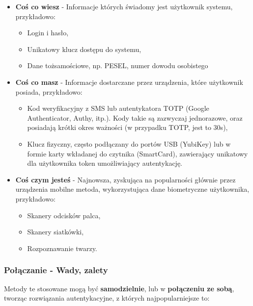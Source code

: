 \begin{itemize}
	\item \textbf{Coś co wiesz} - Informacje których świadomy jest użytkownik systemu, przykładowo:
	\begin{itemize}
		\item Login i hasło,
		\item Unikatowy klucz dostępu do systemu,
		\item Dane tożsamościowe, np. PESEL, numer dowodu osobistego
	\end{itemize}
	\item \textbf{Coś co masz} - Informacje dostarczane przez urządzenia, które użytkownik posiada, przykładowo:
	\begin{itemize}
		\item Kod weryfikacyjny z SMS lub autentykatora TOTP (Google Authenticator, Authy, itp.). Kody takie są zazwyczaj jednorazowe, oraz posiadają krótki okres ważności (w przypadku TOTP, jest to 30s),
		\item Klucz fizyczny, często podłączany do portów USB (YubiKey) lub w formie karty wkładanej do czytnika (SmartCard), zawierający unikatowy dla użytkownika token umożliwiający autentykację.
	\end{itemize}
	\item \textbf{Coś czym jesteś} - Najnowsza, zyskująca na popularności głównie przez urządzenia mobilne metoda, wykorzystująca dane biometryczne użytkownika, przykładowo:
	\begin{itemize}
		\item Skanery odcisków palca,
		\item Skanery siatkówki,
		\item Rozpoznawanie twarzy.
	\end{itemize}
\end{itemize}

\subsubsection{Połączanie - Wady, zalety}

Metody te stosowane mogą być \textbf{samodzielnie}, lub w \textbf{połączeniu ze sobą}, tworząc rozwiązania autentykacyjne, z których najpopularniejsze to:


